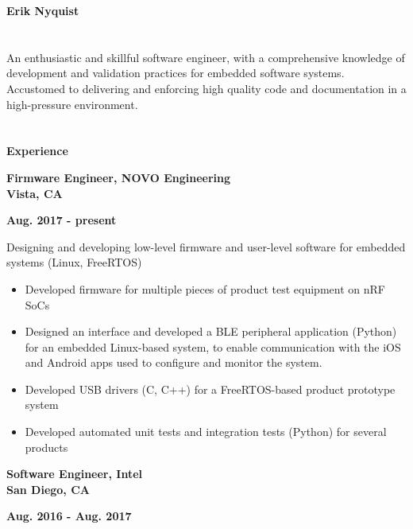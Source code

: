 \documentclass[6pt]{article}
\begin{document}
\begin{minipage}{35em}
%
%
{\Huge \bfseries Erik Nyquist}
\section*{}

An enthusiastic and skillful software engineer, with a comprehensive knowledge of
development and validation practices for embedded software systems. Accustomed to
delivering and enforcing high quality code and documentation in a high-pressure
environment.

\section*{}
{\Large \bfseries Experience}
\break

\hspace*{-\parindent}%
\begin{minipage}{20em}
{\bfseries Firmware Engineer, NOVO Engineering \\
Vista, CA}
\end{minipage}
\hfill
\begin{minipage}{10em}
{
    \bfseries \hfill Aug. 2017 - present \\

}
\end{minipage}
\break
\break
Designing and developing low-level firmware and user-level software for embedded
systems (Linux, FreeRTOS)
\begin{itemize}
    \item Developed firmware for multiple pieces of product test equipment on nRF SoCs
    \item Designed an interface and developed a BLE peripheral application (Python) for an
          embedded Linux-based system, to enable communication with the iOS and Android
          apps used to configure and monitor the system.
    \item Developed USB drivers (C, C++) for a FreeRTOS-based product prototype system
    \item Developed automated unit tests and integration tests (Python) for several products
\end{itemize}

\hspace*{-\parindent}%
\begin{minipage}{20em}
{\bfseries Software Engineer, Intel \\
San Diego, CA}
\end{minipage}
\hfill
\begin{minipage}{12em}
{
    \bfseries \hfill Aug. 2016 - Aug. 2017 \\

}
\end{minipage}
\end{minipage}
\end{document}
